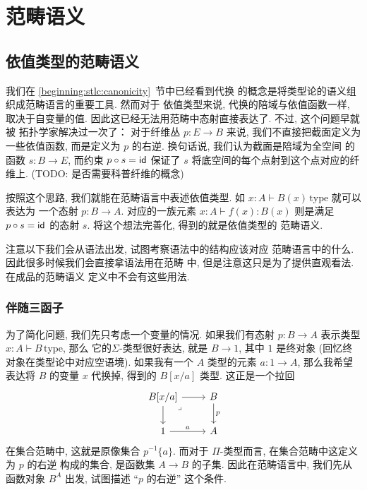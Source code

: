 \chapter{范畴语义}
\section{依值类型的范畴语义}
我们在 \ref{beginning:stlc:canonicity}~节中已经看到代换
的概念是将类型论的语义组织成范畴语言的重要工具. 然而对于
依值类型来说, 代换的陪域与依值函数一样, 取决于自变量的值.
因此这已经无法用范畴中态射直接表达了. 不过, 这个问题早就被
拓扑学家解决过一次了： 对于纤维丛 \(p : E \to B\)
来说, 我们不直接把截面定义为一些依值函数, 而是定义为
\(p\) 的右逆. 换句话说, 我们认为截面是陪域为全空间
的函数 \(s : B \to E\), 而约束 \(p \circ s = \textnormal{\textsf{id}}\)
保证了 \(s\) 将底空间的每个点射到这个点对应的纤维上.
(TODO: 是否需要科普纤维的概念)

按照这个思路, 我们就能在范畴语言中表述依值类型. 如
\(x{:}A \vdash B(x)\,\text{type}\) 就可以表达为
一个态射 \(p : B \to A\). 对应的一族元素
\(x{:}A \vdash f(x) : B(x)\) 则是满足 \(p \circ s = \textnormal{\textsf{id}}\)
的态射 \(s\). 将这个想法完善化, 得到的就是依值类型的
范畴语义.

注意以下我们会从语法出发, 试图考察语法中的结构应该对应
范畴语言中的什么. 因此很多时候我们会直接拿语法用在范畴
中, 但是注意这只是为了提供直观看法. 在成品的范畴语义
定义中不会有这些用法.

\subsection{伴随三函子}
为了简化问题, 我们先只考虑一个变量的情况.
如果我们有态射 \(p : B \to A\) 表示类型
\(x{:}A \vdash B\,\text{type}\), 那么
它的\(\Sigma\)-类型很好表达, 就是 \(B \to 1\),
其中 \(1\) 是终对象 (回忆终对象在类型论中对应空语境).
如果我有一个 \(A\) 类型的元素 \(a : 1 \to A\),
那么我希望表达将 \(B\) 的变量 \(x\) 代换掉, 得到的
\(B[x/a]\) 类型. 这正是一个拉回
\[\begin{tikzcd}
  B[x/a] & B \\
  1 & A
  \arrow["a", from=2-1, to=2-2]
  \arrow["p", from=1-2, to=2-2]
  \arrow[from=1-1, to=2-1]
  \arrow[from=1-1, to=1-2]
  \arrow["\lrcorner"{anchor=center, pos=0.125}, draw=none, from=1-1, to=2-2]
\end{tikzcd}\]
在集合范畴中, 这就是原像集合 \(p^{-1}\{a\}\). 而对于
\(\Pi\)-类型而言, 在集合范畴中这定义为 \(p\) 的右逆
构成的集合, 是函数集 \(A \to B\) 的子集. 因此在范畴语言中,
我们先从函数对象 \(B^A\) 出发, 试图描述 “\(p\) 的右逆” 这个条件.

